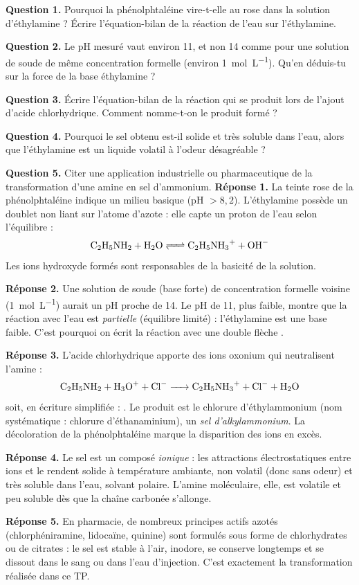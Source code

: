 \documentclass[11pt]{article}
\newcommand{\cle}[1]{{\popxbold\color{popdark}#1}}
\begin{document}
\begin{exoresolu}
\textbf{Question 1.} Pourquoi la phénolphtaléine vire-t-elle au rose dans la solution d'éthylamine ? Écrire l'équation-bilan de la réaction de l'eau sur l'éthylamine.

\textbf{Question 2.} Le pH mesuré vaut environ 11, et non 14 comme pour une solution de soude de même concentration formelle (environ \SI{1}{mol.L^{-1}}). Qu'en déduis-tu sur la force de la base éthylamine ?

\textbf{Question 3.} Écrire l'équation-bilan de la réaction qui se produit lors de l'ajout d'acide chlorhydrique. Comment nomme-t-on le produit formé ?

\textbf{Question 4.} Pourquoi le sel obtenu est-il solide et très soluble dans l'eau, alors que l'éthylamine est un liquide volatil à l'odeur désagréable ?

\textbf{Question 5.} Citer une application industrielle ou pharmaceutique de la transformation d'une amine en sel d'ammonium.
\tcblower
\textbf{Réponse 1.} La teinte rose de la phénolphtaléine indique un milieu \cle{basique} (pH $> 8{,}2$). L'éthylamine possède un doublet non liant sur l'atome d'azote : elle capte un proton de l'eau selon l'équilibre :
\[ \ce{C2H5NH2 + H2O <=> C2H5NH3+ + OH-} \]
Les ions hydroxyde  formés sont responsables de la basicité de la solution.

\textbf{Réponse 2.} Une solution de soude (base forte) de concentration formelle voisine (\SI{1}{mol.L^{-1}}) aurait un pH proche de 14. Le pH de 11, plus faible, montre que la réaction avec l'eau est \emph{partielle} (équilibre limité) : l'éthylamine est une \cle{base faible}. C'est pourquoi on écrit la réaction avec une double flèche \ce{<=>}.

\textbf{Réponse 3.} L'acide chlorhydrique apporte des ions oxonium  qui neutralisent l'amine :
\[ \ce{C2H5NH2 + H3O+ + Cl- -> C2H5NH3+ + Cl- + H2O} \]
soit, en écriture simplifiée : . Le produit est le \cle{chlorure d'éthylammonium} (nom systématique : chlorure d'éthanaminium), un \emph{sel d'alkylammonium}. La décoloration de la phénolphtaléine marque la disparition des ions  en excès.

\textbf{Réponse 4.} Le sel  est un composé \emph{ionique} : les attractions électrostatiques entre ions  et  le rendent solide à température ambiante, non volatil (donc sans odeur) et très soluble dans l'eau, solvant polaire. L'amine moléculaire, elle, est volatile et peu soluble dès que la chaîne carbonée s'allonge.

\textbf{Réponse 5.} En pharmacie, de nombreux principes actifs azotés (chlorphéniramine, lidocaïne, quinine) sont formulés sous forme de chlorhydrates ou de citrates : le sel est stable à l'air, inodore, se conserve longtemps et se dissout dans le sang ou dans l'eau d'injection. C'est exactement la transformation réalisée dans ce TP.
\end{exoresolu}
\end{document}
